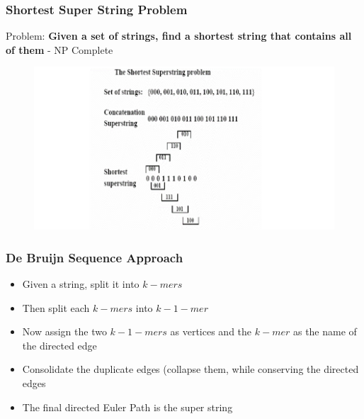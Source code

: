 \documentclass{beamer}
\begin{document}

\begin{frame}
\frametitle{Shortest Super String Problem}
Problem: \textbf{Given a set of strings, find a shortest string that contains all of them} - NP Complete
\begin{figure}[h]
\includegraphics[scale = 0.4]{ssexample.png}
\end{figure}
\end{frame}


\begin{frame}
\frametitle{De Bruijn Sequence Approach}
\begin{itemize}
\item Given a string, split it into $k-mers$
\pause
\item Then split each $k-mers$ into $k-1-mer$
\pause
\item Now assign the two $k-1-mers$ as vertices and the $k-mer$ as the name of the directed edge
\pause
\item Consolidate the duplicate edges (collapse them, while conserving the directed edges
\pause
\item The final directed Euler Path is the super string
\end{itemize}
\end{frame}

\end{document}

